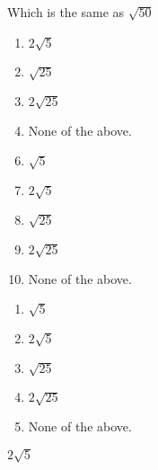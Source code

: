 


 Which is the same as $\sqrt{50}$


\ifsat
	\begin{enumerate}[label=\Alph*)]
		\item  $2\sqrt{5}$%
		\item  $\sqrt{25}$
		\item  $2\sqrt{25}$
		\item  None of the above.
	\end{enumerate}
\else
\fi

\ifacteven
	\begin{enumerate}[label=\textbf{\Alph*.},itemsep=\fill,align=left]
		\setcounter{enumii}{5}
		\item   $\sqrt{5}$
		\item  $2\sqrt{5}$%
		\item  $\sqrt{25}$
		\addtocounter{enumii}{1}
		\item  $2\sqrt{25}$
		\item  None of the above.
	\end{enumerate}
\else
\fi

\ifactodd
	\begin{enumerate}[label=\textbf{\Alph*.},itemsep=\fill,align=left]
		\item   $\sqrt{5}$
		\item  $2\sqrt{5}$%
		\item  $\sqrt{25}$
		\item  $2\sqrt{25}$
		\item  None of the above.
	\end{enumerate}
\else
\fi

\ifgridin
  $2\sqrt{5}$%
		
\else
\fi

